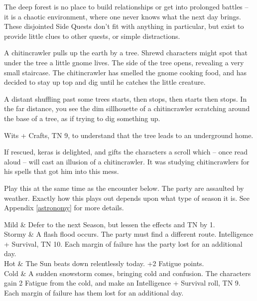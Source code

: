\begin{multicols}{2}
\label{interruptions}

\sqminitoc

The deep forest is no place to build relationships or get into prolonged battles -- it is a chaotic environment, where one never knows what the next day brings.
These disjointed Side Quests don't fit with anything in particular, but exist to provide little clues to other quests, or simple distractions.


A chitincrawler pulls up the earth by a tree.  Shrewd characters might spot that under the tree a little gnome lives.  The side of the tree opens, revealing a very small staircase.  The chitincrawler has smelled the gnome cooking food, and has decided to stay up top and dig until he catches the little creature.

\begin{boxtext}

	A distant shuffling past some trees starts, then stops, then starts then stops.
	In the far distance, you see the dim sillhouette of a chitincrawler scratching around the base of a tree, as if trying to dig something up.

\end{boxtext}

Wits + Crafts, TN 9, to understand that the tree leads to an underground home.

\chitincrawler

\keras

If rescued, \gls{keras} is delighted, and gifts the characters a scroll which -- once read aloud -- will cast an illusion of a chitincrawler.  It was studying chitincrawlers for his spells that got him into this mess.


Play this at the same time as the encounter below.
The party are assaulted by weather.
Exactly how this plays out depends upon what type of season it is.
See Appendix \ref{astronomy} for more details.

\begin{rollchart}

	Mild & Defer to the next Season, but lessen the effects and TN by 1. \\
	Stormy & A flash flood occurs.  The party must find a different route.  Intelligence + Survival, TN 10.  Each margin of failure has the party lost for an additional day. \\
	Hot & The Sun beats down relentlessly today.  +2 Fatigue points. \\
	Cold & A sudden snowstorm comes, bringing cold and confusion.  The characters gain 2 Fatigue from the cold, and make an Intelligence + Survival roll, TN 9.  Each margin of failure has them lost for an additional day.


\end{rollchart}
\end{multicols}
